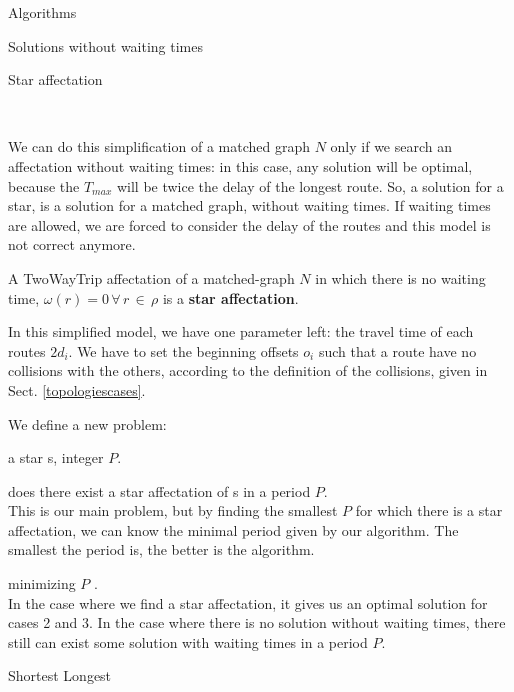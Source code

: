 \documentclass[a4paper,10pt]{report}
\begin{document}
\begin{chapter}{Algorithms}
\begin{section}{Solutions without waiting times}
\begin{subsection}{Star affectation}
\begin{center}
\\
\end{center}
 

We can do this simplification of a matched graph $N$ only if we search an affectation without waiting times: in this case, any solution
will be optimal, because the $T_{max}$ will be twice the delay of the longest route. So, a solution for a star, is a solution for a matched
graph, without waiting times. If waiting times are allowed, we are forced to consider the delay of the routes and this model is not
correct anymore.

A TwoWayTrip affectation of a matched-graph $N$ in which there is no waiting time, $\omega(r) = 0 \,\forall\, r \,\in\, \rho$ is a {\bf star affectation}.

In this simplified model, we have one parameter left: the travel time of each routes $2d_i$.
We have to set the beginning offsets $o_i$ such that a route have no collisions with the others, 
according to the definition of the collisions, given in Sect. \ref{topologiescases}.


We define a new problem: 



 a star s, integer $P$.

 does there exist a star affectation of s in a period $P$.\\

This is our main problem, but by finding the smallest $P$ for which there is a star affectation, we can know 
the minimal period given by our algorithm. The smallest the period is, the better is the algorithm.


 minimizing $P$ .\\

In the case where we find a star affectation, it gives us an optimal solution for cases 2 and 3.
In the case where there is no solution without waiting times, there still can exist some solution with waiting times in 
a period $P$.
\end{subsection}
\begin{subsection}{Shortest Longest}
 

\end{subsection}
\end{section}
\end{chapter}
\end{document}
